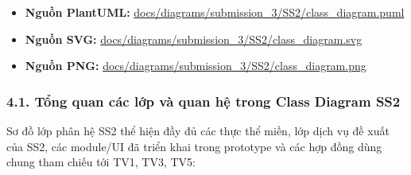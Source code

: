 \documentclass[11pt,a4paper]{article}
\providecommand{\tightlist}{%
  \setlength{\itemsep}{0pt}\setlength{\parskip}{0pt}}
\begin{document}
\begin{itemize}
\tightlist
\item
  \textbf{Nguồn PlantUML:}
  \href{../../../diagrams/submission_3/SS2/class_diagram.puml}{docs/diagrams/submission\_3/SS2/class\_diagram.puml}
\item
  \textbf{Nguồn SVG:}
  \href{../../../diagrams/submission_3/SS2/class_diagram.svg}{docs/diagrams/submission\_3/SS2/class\_diagram.svg}
\item
  \textbf{Nguồn PNG:}
  \href{../../../diagrams/submission_3/SS2/class_diagram.png}{docs/diagrams/submission\_3/SS2/class\_diagram.png}
\end{itemize}

\hypertarget{tux1ed5ng-quan-cuxe1c-lux1edbp-vuxe0-quan-hux1ec7-trong-class-diagram-ss2}{%
\subsubsection{4.1. Tổng quan các lớp và quan hệ trong Class Diagram
SS2}\label{tux1ed5ng-quan-cuxe1c-lux1edbp-vuxe0-quan-hux1ec7-trong-class-diagram-ss2}}

Sơ đồ lớp phân hệ SS2 thể hiện đầy đủ các thực thể miền, lớp dịch vụ đề
xuất của SS2, các module/UI đã triển khai trong prototype và các hợp
đồng dùng chung tham chiếu tới TV1, TV3, TV5:
\end{document}
